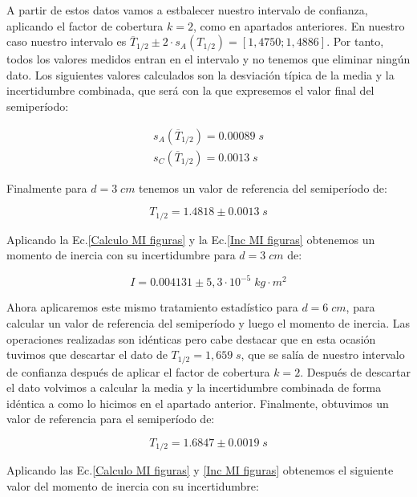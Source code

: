 \documentclass[a4paper,12pt,titlepage]{article}
\begin{document}
A partir de estos datos vamos a estbalecer nuestro intervalo de confianza, aplicando el factor de cobertura $k=2$, como en apartados anteriores. En nuestro caso nuestro intervalo es $\overline{T}_{1/2} \pm 2\cdot s_A(T_{1/2}) = [1,4750;1,4886]$. Por tanto, todos los valores medidos entran en el intervalo y no tenemos que eliminar ningún dato. Los siguientes valores calculados son la desviación típica de la media y la incertidumbre combinada, que será con la que expresemos el valor final del semiperíodo:

\begin{equation}
    \begin{gathered}
        s_A(\overline{T}_{1/2}) = 0.00089\; s\\
        s_C(\overline{T}_{1/2}) = 0.0013\; s
    \end{gathered}
\end{equation}

Finalmente para $d=3 \; cm$ tenemos un valor de referencia del semiperíodo de:

\begin{equation}
    T_{1/2} = 1.4818 \pm 0.0013\; s
\end{equation}

Aplicando la Ec.\ref{Calculo MI figuras} y la Ec.\ref{Inc MI figuras} obtenemos un momento de inercia con su incertidumbre para $d=3 \; cm$ de:

\begin{equation}
    I = 0.004131 \pm 5,3 \cdot 10^{-5} \; kg\cdot m^2
\end{equation}

Ahora aplicaremos este mismo tratamiento estadístico para $d=6 \; cm$, para calcular un valor de referencia del semiperíodo y luego el momento de inercia. Las operaciones realizadas son idénticas pero cabe destacar que en esta ocasión tuvimos que descartar el dato de $T_{1/2}=1,659 \;s$, que se salía de nuestro intervalo de confianza después de aplicar el factor de cobertura $k=2$. Después de descartar el dato volvimos a calcular la media y la incertidumbre combinada de forma idéntica a como lo hicimos en el apartado anterior. Finalmente, obtuvimos un valor de referencia para el semiperíodo de:

\begin{equation}
    T_{1/2} = 1.6847 \pm 0.0019 \; s
\end{equation}

Aplicando las Ec.\ref{Calculo MI figuras} y \ref{Inc MI figuras} obtenemos el siguiente valor del momento de inercia con su incertidumbre:
\end{document}
